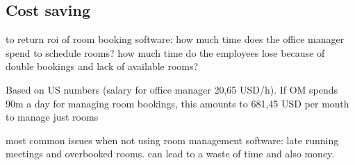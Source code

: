 

\subsection{Cost saving}
to return roi of room booking software: how much time does the office manager spend to schedule rooms? how much time do the employees lose because of double bookings and lack of available rooms? \cite{roomzilla9}

Based on US numbers (salary for office manager 20,65 USD/h). If OM spends 90m a day for managing room bookings, this amounts to 681,45 USD per month to manage just rooms \cite{roomzilla9}

most common issues when not using room management software: late running meetings and overbooked rooms. can lead to a waste of time and also money.  \cite{roomzilla9}